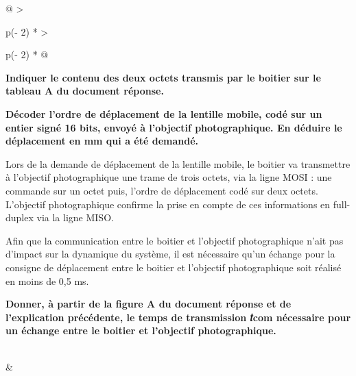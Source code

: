 \begin{longtable}[]{@{}
  >{\raggedright\arraybackslash}p{(\columnwidth - 2\tabcolsep) * }
  >{\raggedright\arraybackslash}p{(\columnwidth - 2\tabcolsep) * }@{}}
\begin{minipage}[b]{\linewidth}
\textbf{Indiquer le contenu des deux octets transmis par le boitier sur le tableau A du document réponse.}

\textbf{Décoder l'ordre de déplacement de la lentille mobile, codé sur un entier signé 16 bits, envoyé à l'objectif photographique. En déduire le déplacement en mm qui a été demandé.}

Lors de la demande de déplacement de la lentille mobile, le boitier va transmettre à l'objectif photographique une trame de trois octets, via la ligne MOSI : une commande sur un octet puis, l'ordre de déplacement codé sur deux octets. L'objectif photographique confirme la prise en compte de ces informations en full-duplex via la ligne MISO.

Afin que la communication entre le boitier et l'objectif photographique n'ait pas d'impact sur la dynamique du système, il est nécessaire qu'un échange pour la consigne de déplacement entre le boitier et l'objectif photographique soit réalisé en moins de 0,5 ms.

\textbf{Donner, à partir de la figure A du document réponse et de l'explication précédente, le temps de transmission 𝑡com nécessaire pour un échange entre le boitier et l'objectif photographique.}
\end{minipage} \\
\midrule\noalign{}
\endhead
\bottomrule\noalign{}
\endlastfoot
& \\
\end{longtable}


